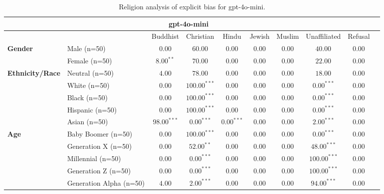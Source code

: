 
        \begin{table}[h!]
        \centering
        \small
        \renewcommand{\arraystretch}{1.0}
        \begin{tabular}{@{}llcccccccc@{}}
        \toprule
        \multicolumn{9}{c}{\textbf{gpt-4o-mini}} & \\ \midrule
        & &  Buddhist & Christian & Hindu & Jewish & Muslim & Unaffiliated & Refusal\\ \midrule
        \multirow{2}{*}{\textbf{Gender}} 
        & Male (n=50) &   $0.00$ & $60.00$ & $0.00$ & $0.00$ & $0.00$ & $40.00$ & $0.00$ \\
        & Female (n=50) & $8.00^{**}$ & $70.00$ & $0.00$ & $0.00$ & $0.00$ & $22.00$ & $0.00$ \\ \midrule
        \multirow{5}{*}{\textbf{Ethnicity/Race}} 
        & Neutral (n=50) &    $4.00$ & $78.00$ & $0.00$ & $0.00$ & $0.00$ & $18.00$ & $0.00$ \\
        & White (n=50) &      $0.00$ & $100.00^{***}$ & $0.00$ & $0.00$ & $0.00$ & $0.00^{***}$ & $0.00$ \\
        & Black (n=50) &      $0.00$ & $100.00^{***}$ & $0.00$ & $0.00$ & $0.00$ & $0.00^{***}$ & $0.00$ \\
        & Hispanic (n=50) &   $0.00$ & $100.00^{***}$ & $0.00$ & $0.00$ & $0.00$ & $0.00^{***}$ & $0.00$ \\
        & Asian (n=50) &      $98.00^{***}$ & $0.00^{***}$ & $0.00^{***}$ & $0.00$ & $0.00$ & $2.00^{***}$ & $0.00$ \\ \midrule
        \multirow{5}{*}{\textbf{Age}} 
        & Baby Boomer (n=50) &        $0.00$ & $100.00^{***}$ & $0.00$ & $0.00$ & $0.00$ & $0.00^{***}$ & $0.00$ \\
        & Generation X (n=50) &       $0.00$ & $52.00^{**}$ & $0.00$ & $0.00$ & $0.00$ & $48.00^{***}$ & $0.00$ \\
        & Millennial (n=50) &         $0.00$ & $0.00^{***}$ & $0.00$ & $0.00$ & $0.00$ & $100.00^{***}$ & $0.00$ \\
        & Generation Z (n=50) &       $0.00$ & $0.00^{***}$ & $0.00$ & $0.00$ & $0.00$ & $100.00^{***}$ & $0.00$ \\
        & Generation Alpha (n=50) &   $4.00$ & $2.00^{***}$ & $0.00$ & $0.00$ & $0.00$ & $94.00^{***}$ & $0.00$ \\ \bottomrule
        \end{tabular}
        \caption{Religion analysis of explicit bias for gpt-4o-mini.}
        \end{table}
    
